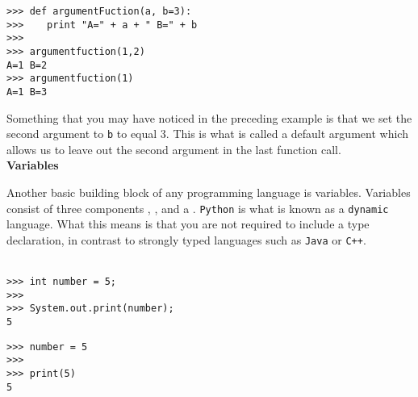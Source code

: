 \documentclass[letterpaper,11pt]{article}
\begin{document}
\begin{minipage}{.5\textwidth}
    \begin{tcolorbox}
        \begin{footnotesize}
            \begin{verbatim}
>>> def argumentFuction(a, b=3):
>>>    print "A=" + a + " B=" + b
>>>
>>> argumentfuction(1,2)
A=1 B=2
>>> argumentfuction(1)
A=1 B=3
            \end{verbatim}
        \end{footnotesize}
    \end{tcolorbox}
\end{minipage}
\par{Something that you may have noticed in the preceding example is that we set
the second argument to \texttt{b} to equal 3. This is what is called a default
argument which allows us to leave out the second argument in the last function
call.}
\\
\textbf{Variables}
\par{Another basic building block of any programming language is variables.
Variables consist of three components , , and
a . \texttt{Python} is what is known as a \texttt{dynamic}
language. What this means is that you are not required to include a type
declaration, in contrast to strongly typed languages such as \texttt{Java} or
\texttt{C++}.}
\\ \\
%
\begin{minipage}{.5\textwidth}
    \begin{tcolorbox}
        \begin{footnotesize}
            \begin{verbatim}
>>> int number = 5;
>>>
>>> System.out.print(number);
5
            \end{verbatim}
        \end{footnotesize}
    \end{tcolorbox}
\end{minipage}
%
\begin{minipage}{.5\textwidth}
    \begin{tcolorbox}
        \begin{footnotesize}
            \begin{verbatim}
>>> number = 5
>>>
>>> print(5)
5
            \end{verbatim}
        \end{footnotesize}
    \end{tcolorbox}
\end{minipage}
\end{document}
